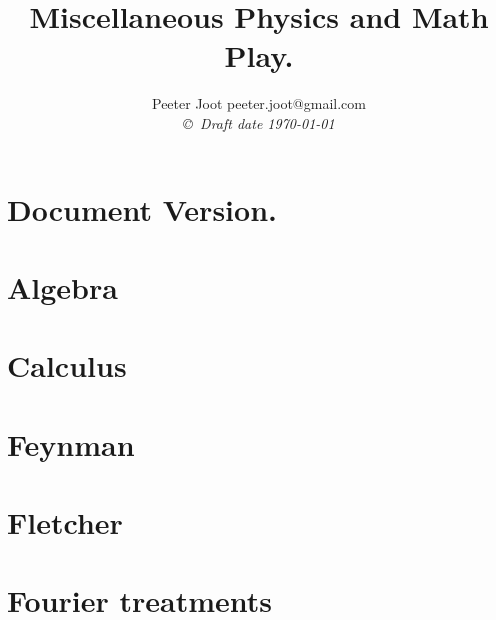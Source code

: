 \documentclass[12pt,leqno]{book}
\begin{document}

\title{Miscellaneous Physics and Math Play.}
\author{Peeter Joot  \quad peeter.joot@gmail.com \\
{\small\em \copyright \  Draft date \today }}

\maketitle

\clearpage{}
\tableofcontents

\clearpage{}

\pagestyle{plain}




\part{Document Version.}


\part{Algebra}





\part{Calculus}








\part{Feynman}


\part{Fletcher}


\part{Fourier treatments}

\end{document}
